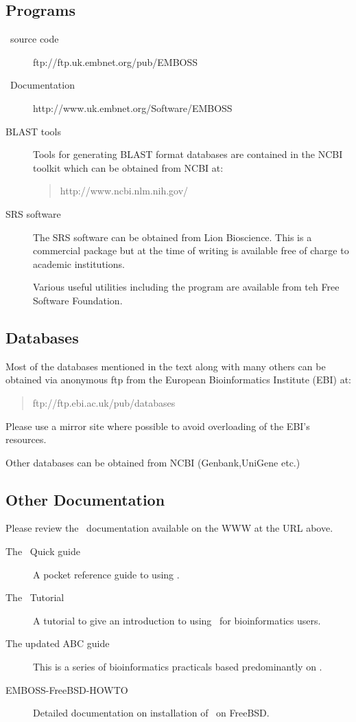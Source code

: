 \documentclass{report}
\begin{document}
\subsection{Programs}
\begin{description}
\item[\EMBOSS\ source code]ftp://ftp.uk.embnet.org/pub/EMBOSS
\item[\EMBOSS\ Documentation]http://www.uk.embnet.org/Software/EMBOSS
\item[BLAST tools]Tools for generating BLAST format databases are contained in the NCBI toolkit which can be obtained from NCBI at:
\begin{quote}
http://www.ncbi.nlm.nih.gov/
\end{quote}
\item[SRS software]The SRS software can be obtained from Lion Bioscience. This is a commercial package but at the time of writing is available free of charge to academic institutions.
\item[]Various useful utilities including the  program are available from teh Free Software Foundation.
\end{description}
\subsection{Databases}

Most of the databases mentioned in the text along with many others can be obtained via anonymous ftp from the European Bioinformatics Institute (EBI) at:
\begin{quote}
ftp://ftp.ebi.ac.uk/pub/databases
\end{quote}
Please use a mirror site where possible to avoid overloading of the EBI's resources.

Other databases can be obtained from NCBI (Genbank,UniGene etc.)

\subsection{Other Documentation}
Please review the \EMBOSS\ documentation available on the WWW at the URL above.

\begin{description}
\item[The \EMBOSS\ Quick guide]A pocket reference guide to using \EMBOSS{}. 
\item[The \EMBOSS\ Tutorial]A tutorial to give an introduction to using \EMBOSS\ for bioinformatics users.
\item[The updated ABC guide]This is a series of bioinformatics practicals based predominantly on \EMBOSS.
\item[EMBOSS-FreeBSD-HOWTO]Detailed documentation on installation of \EMBOSS\ on FreeBSD.
\end{description}
\end{document}
